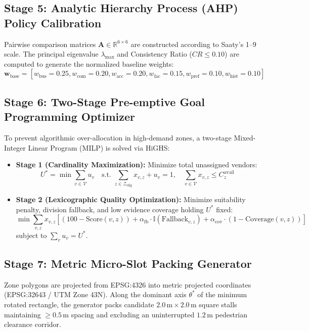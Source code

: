 \subsection{Stage 5: Analytic Hierarchy Process (AHP) Policy Calibration}
Pairwise comparison matrices $\mathbf{A} \in \mathbb{R}^{6 \times 6}$ are constructed according to Saaty's 1--9 scale. The principal eigenvalue $\lambda_{\max}$ and Consistency Ratio ($CR \le 0.10$) are computed to generate the normalized baseline weights:
\begin{equation}
    \mathbf{w}_{\text{base}} = [w_{\text{bus}}=0.25, w_{\text{com}}=0.20, w_{\text{acc}}=0.20, w_{\text{fac}}=0.15, w_{\text{pref}}=0.10, w_{\text{hist}}=0.10]
\end{equation}

\subsection{Stage 6: Two-Stage Pre-emptive Goal Programming Optimizer}
To prevent algorithmic over-allocation in high-demand zones, a two-stage Mixed-Integer Linear Program (MILP) is solved via HiGHS:
\begin{itemize}
    \item \textbf{Stage 1 (Cardinality Maximization):} Minimize total unassigned vendors:
    \begin{equation}
        U^* = \min \sum_{v \in \mathcal{V}} u_v \quad \text{s.t. } \sum_{z \in \mathcal{Z}_{\text{elig}}} x_{v,z} + u_v = 1, \quad \sum_{v \in \mathcal{V}} x_{v,z} \le C_z^{\text{avail}}
    \end{equation}
    \item \textbf{Stage 2 (Lexicographic Quality Optimization):} Minimize suitability penalty, division fallback, and low evidence coverage holding $U^*$ fixed:
    \begin{equation}
        \min \sum_{v,z} x_{v,z} \left[ (100 - \text{Score}(v, z)) + \alpha_{\text{fb}} \cdot \mathbb{I}(\text{Fallback}_{v,z}) + \alpha_{\text{cov}} \cdot (1 - \text{Coverage}(v, z)) \right]
    \end{equation}
    subject to $\sum_{v} u_v = U^*$.
\end{itemize}

\subsection{Stage 7: Metric Micro-Slot Packing Generator}
Zone polygons are projected from EPSG:4326 into metric projected coordinates (EPSG:32643 / UTM Zone 43N). Along the dominant axis $\theta^*$ of the minimum rotated rectangle, the generator packs candidate $2.0\,\text{m} \times 2.0\,\text{m}$ square stalls maintaining $\ge 0.5\,\text{m}$ spacing and excluding an uninterrupted $1.2\,\text{m}$ pedestrian clearance corridor.

